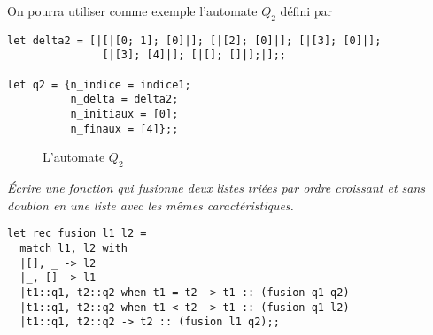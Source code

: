 \newpage

On pourra utiliser comme exemple l'automate $Q_2$ défini par 
\begin{lstlisting}
let delta2 = [|[|[0; 1]; [0]|]; [|[2]; [0]|]; [|[3]; [0]|]; 
               [|[3]; [4]|]; [|[]; []|];|];;

let q2 = {n_indice = indice1;
          n_delta = delta2;
          n_initiaux = [0];
          n_finaux = [4]};;
\end{lstlisting}
\begin{figure}
\centering
{}
\caption{L'automate $Q_2$}
\end{figure}
\begin{Exercise}\it 
Écrire une fonction qui fusionne deux listes triées par ordre croissant et sans doublon en une liste avec les mêmes caractéristiques.
\end{Exercise} 
\begin{Answer}
\begin{lstlisting}
let rec fusion l1 l2 = 
  match l1, l2 with
  |[], _ -> l2
  |_, [] -> l1
  |t1::q1, t2::q2 when t1 = t2 -> t1 :: (fusion q1 q2)
  |t1::q1, t2::q2 when t1 < t2 -> t1 :: (fusion q1 l2)
  |t1::q1, t2::q2 -> t2 :: (fusion l1 q2);;
\end{lstlisting}
\end{Answer} 

